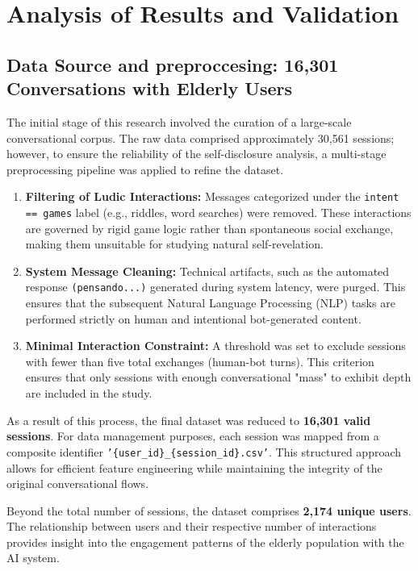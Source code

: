\section{Analysis of Results and Validation}

\subsection{Data Source and preproccesing: 16,301 Conversations with Elderly Users}

The initial stage of this research involved the curation of a large-scale conversational corpus. The raw data comprised approximately 30,561 sessions; however, to ensure the reliability of the self-disclosure analysis, a multi-stage preprocessing pipeline was applied to refine the dataset.

\begin{enumerate}
    \item \textbf{Filtering of Ludic Interactions:} Messages categorized under the \texttt{intent == games} label (e.g., riddles, word searches) were removed. These interactions are governed by rigid game logic rather than spontaneous social exchange, making them unsuitable for studying natural self-revelation.
    \item \textbf{System Message Cleaning:} Technical artifacts, such as the automated response \texttt{(pensando...)} generated during system latency, were purged. This ensures that the subsequent Natural Language Processing (NLP) tasks are performed strictly on human and intentional bot-generated content.
    \item \textbf{Minimal Interaction Constraint:} A threshold was set to exclude sessions with fewer than five total exchanges (human-bot turns). This criterion ensures that only sessions with enough conversational "mass" to exhibit depth are included in the study.
\end{enumerate}



As a result of this process, the final dataset was reduced to \textbf{16,301 valid sessions}. For data management purposes, each session was mapped from a composite identifier \newline \texttt{'\{user\_id\}\_\{session\_id\}.csv'}. This structured approach allows for efficient feature engineering while maintaining the integrity of the original conversational flows.


Beyond the total number of sessions, the dataset comprises \textbf{2,174 unique users}. The relationship between users and their respective number of interactions provides insight into the engagement patterns of the elderly population with the AI system.

